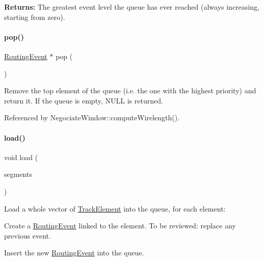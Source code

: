 {\bfseries Returns\+:} The greatest event level the queue has ever reached (always increasing, starting from zero). \mbox{\label{classKite_1_1RoutingEventQueue_af1b85d0b49565932c55ec55625cd8838}} 
\paragraph{\texorpdfstring{pop()}{pop()}}
{\footnotesize\ttfamily \hyperlink{classKite_1_1RoutingEvent}{Routing\+Event} $\ast$ pop (\begin{DoxyParamCaption}{ }\end{DoxyParamCaption})}

Remove the top element of the queue (i.\+e. the one with the highest priority) and return it. If the queue is empty, {\ttfamily N\+U\+LL} is returned. 

Referenced by Negociate\+Window\+::compute\+Wirelength().

\mbox{\label{classKite_1_1RoutingEventQueue_a7f5a051812b2925dc3c1cca8b2011237}} 
\paragraph{\texorpdfstring{load()}{load()}}
{\footnotesize\ttfamily void load (\begin{DoxyParamCaption}\item[{const vector$<$ \hyperlink{classKite_1_1TrackElement}{Track\+Element} $\ast$$>$ \&}]{segments }\end{DoxyParamCaption})}

Load a whole vector of \hyperlink{classKite_1_1TrackElement}{Track\+Element} into the queue, for each element\+:
\begin{DoxyItemize}
\item Create a \hyperlink{classKite_1_1RoutingEvent}{Routing\+Event} linked to the element. To be reviewed\+: replace any previous event.
\item Insert the new \hyperlink{classKite_1_1RoutingEvent}{Routing\+Event} into the queue.
\end{DoxyItemize}


